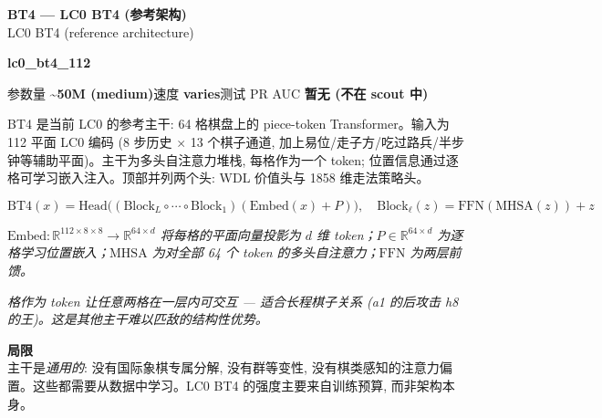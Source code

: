 \documentclass[10pt,a4paper]{article}
\newcommand{\pilllc}[0]{\colorbox{lc0bluebg}{\strut\textcolor{lc0blue}{\scriptsize\bfseries\sffamily lc0\_bt4\_112}}}
\begin{document}
\begin{tcolorbox}
\begin{tcolorbox}[archhead, boxsep=0pt, top=4pt, bottom=4pt]
\textcolor{deepforest}{\sffamily\bfseries\large BT4 --- LC0 BT4 (参考架构)} \\[2pt]
{\color{muted}\small LC0 BT4 (reference architecture)}
\\[1pt]\textcolor{muted}{\sffamily\scriptsize \pilllc{}\quad 参数量 \textbf{\textasciitilde{}50M (medium)}\quad 速度 \textbf{varies}\quad 测试 PR AUC \textbf{暂无 (不在 scout 中)}}
\end{tcolorbox}
\smallskip
BT4 是当前 LC0 的参考主干: 64 格棋盘上的 piece-token Transformer。输入为 112 平面 LC0 编码 (8 步历史 $\times$ 13 个棋子通道, 加上易位/走子方/吃过路兵/半步钟等辅助平面)。主干为多头自注意力堆栈, 每格作为一个 token; 位置信息通过逐格可学习嵌入注入。顶部并列两个头: WDL 价值头与 1858 维走法策略头。
\par\smallskip
\begin{equation*}
\mathrm{BT4}(x) = \mathrm{Head}\!\bigl( (\mathrm{Block}_L \circ \cdots \circ \mathrm{Block}_1)(\mathrm{Embed}(x) + P) \bigr), \quad \mathrm{Block}_\ell(z) = \mathrm{FFN}(\mathrm{MHSA}(z)) + z
\end{equation*}
\par\vspace{-4pt}\begin{center}\textit{\textcolor{muted}{\small $\mathrm{Embed}: \mathbb{R}^{112\times8\times8}\to\mathbb{R}^{64\times d}$ 将每格的平面向量投影为 $d$ 维 token；$P\in\mathbb{R}^{64\times d}$ 为逐格学习位置嵌入；$\mathrm{MHSA}$ 为对全部 64 个 token 的多头自注意力；$\mathrm{FFN}$ 为两层前馈。}}\end{center}
\par\smallskip{\color{forest}\sffamily\bfseries\textgreater\,}\textit{格作为 token 让任意两格在一层内可交互 --- 适合长程棋子关系 (a1 的后攻击 h8 的王)。这是其他主干难以匹敌的结构性优势。}
\par\smallskip\textbf{\sffamily\footnotesize\color{muted}局限}\\
主干是\emph{通用的}: 没有国际象棋专属分解, 没有群等变性, 没有棋类感知的注意力偏置。这些都需要从数据中学习。LC0 BT4 的强度主要来自训练预算, 而非架构本身。
\end{tcolorbox}
\end{document}
